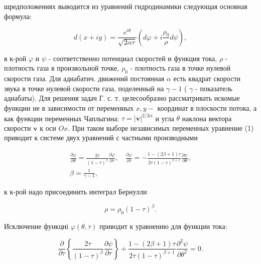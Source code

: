 \documentclass[10pt]{article}
\begin{document}
шредположениях выводится из уравнений гидродинамики следующая основная формула:



\[

d(x+i y)=\frac{e^{i \theta}}{\sqrt{2 \alpha \tau}}\left(d \varphi+i \frac{\rho_{0}}{\rho} d \psi\right),

\]



в к-рой $\varphi$ и $\psi$ - соответственно потенциал скоростей и функция тока, $\rho$ - плотность газа в произвольной точке, $\rho_{0}$ - плотность газа в точке нулевой скорости газа. Для адиабатич. движений постоянная $\alpha$ есть квадрат скорости звука в точке нулевой скорости газа, поделенный на $\gamma-1$ ( $\gamma$ - показатель адиабаты). Для решения задач Г. с. т. целесообразно рассматривать искомые функции не в зависимости от переменных $x, y-$ координат в плоскости потока, а как функции переменных Чаплыгина: $\tau=|\boldsymbol{v}|^{2 / 2 \alpha}$ и угла $\theta$ наклона вектора скорости $\boldsymbol{v}$ к оси $O x$. При таком выборе независимых переменных уравнение (1) приводит к системе двух уравнений с частными производными



\[

\begin{gathered}

\frac{\partial \varphi}{\partial \theta}=\frac{2 \tau}{(1-\tau)^{\beta}} \frac{\partial \varphi}{\partial \tau}, \quad \frac{\partial \varphi}{\partial \tau}=-\frac{1-(2 \beta+1) \tau}{2 \tau(1-\tau)^{\beta+1}} \frac{\partial \psi}{\partial \theta}, \\

\beta=\frac{1}{\gamma-1},

\end{gathered}

\]



к к-рой надо присоединить интеграл Бернулли



\[

\rho=\rho_{0}(1-\tau)^{\beta} .

\]



Исключение функциі $\varphi(\theta, \tau)$ приводит к уравнению для функции тока:



\[

\frac{\partial}{\partial \tau}\left\{\frac{2 \tau}{(1-\tau)^{\beta}} \frac{\partial \psi}{\partial \tau}\right\}+\frac{1-(2 \beta+1) \tau}{2 \tau(1-\tau)^{\beta+1}} \frac{\partial^{2} \psi}{\partial \theta^{2}}=0 .

\]
\end{document}
